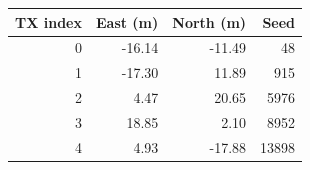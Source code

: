 \begin{tabular}{rrrr}
\toprule
TX index & East (m) & North (m) & Seed \\
\midrule
0 & -16.14 & -11.49 & 48 \\
1 & -17.30 & 11.89 & 915 \\
2 & 4.47 & 20.65 & 5976 \\
3 & 18.85 & 2.10 & 8952 \\
4 & 4.93 & -17.88 & 13898 \\
\bottomrule
\end{tabular}
